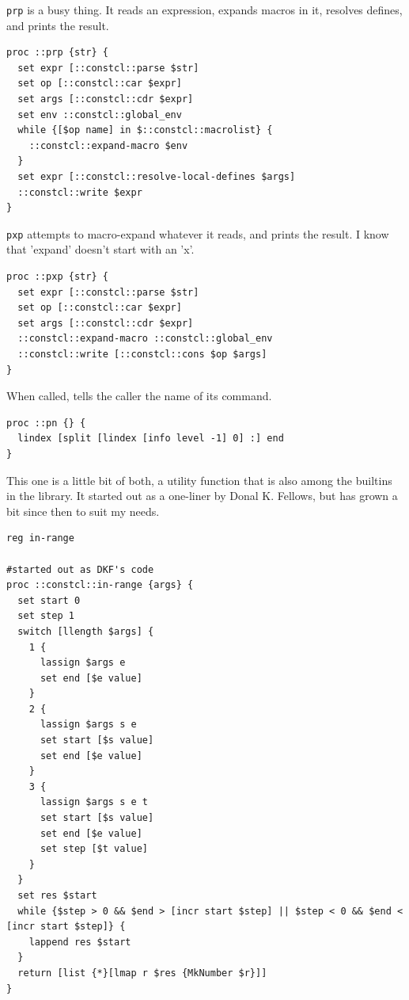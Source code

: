 \documentclass[twoside,9pt]{report}
\begin{document}
\texttt{prp} is a busy thing. It reads an expression, expands macros in it, resolves defines, and prints the result.

\noindent\makebox[\linewidth]{\rule{\linewidth}{0.4pt}}
\begin{lstlisting}
proc ::prp {str} {
  set expr [::constcl::parse $str]
  set op [::constcl::car $expr]
  set args [::constcl::cdr $expr]
  set env ::constcl::global_env
  while {[$op name] in $::constcl::macrolist} {
    ::constcl::expand-macro $env
  }
  set expr [::constcl::resolve-local-defines $args]
  ::constcl::write $expr
}
\end{lstlisting}
\noindent\makebox[\linewidth]{\rule{\linewidth}{0.4pt}}

\texttt{pxp} attempts to macro-expand whatever it reads, and prints the result. I know that 'expand' doesn't start with an 'x'.

\noindent\makebox[\linewidth]{\rule{\linewidth}{0.4pt}}
\begin{lstlisting}
proc ::pxp {str} {
  set expr [::constcl::parse $str]
  set op [::constcl::car $expr]
  set args [::constcl::cdr $expr]
  ::constcl::expand-macro ::constcl::global_env
  ::constcl::write [::constcl::cons $op $args]
}
\end{lstlisting}
\noindent\makebox[\linewidth]{\rule{\linewidth}{0.4pt}}

When called, tells the caller the name of its command.

\noindent\makebox[\linewidth]{\rule{\linewidth}{0.4pt}}
\begin{lstlisting}
proc ::pn {} {
  lindex [split [lindex [info level -1] 0] :] end
}
\end{lstlisting}
\noindent\makebox[\linewidth]{\rule{\linewidth}{0.4pt}}

This one is a little bit of both, a utility function that is also among the builtins in the library. It started out as a one-liner by Donal K. Fellows, but has grown a bit since then to suit my needs.

\noindent\makebox[\linewidth]{\rule{\linewidth}{0.4pt}}
\begin{lstlisting}
reg in-range
 
#started out as DKF's code
proc ::constcl::in-range {args} {
  set start 0
  set step 1
  switch [llength $args] {
    1 {
      lassign $args e
      set end [$e value]
    }
    2 {
      lassign $args s e
      set start [$s value]
      set end [$e value]
    }
    3 {
      lassign $args s e t
      set start [$s value]
      set end [$e value]
      set step [$t value]
    }
  }
  set res $start
  while {$step > 0 && $end > [incr start $step] || $step < 0 && $end < [incr start $step]} {
    lappend res $start
  }
  return [list {*}[lmap r $res {MkNumber $r}]]
}
\end{lstlisting}
\noindent\makebox[\linewidth]{\rule{\linewidth}{0.4pt}}
\end{document}

